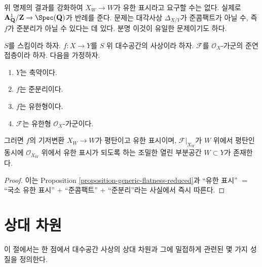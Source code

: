 \noindent
위 명제의 결과를 강화하여 $X_W \to W$가 유한 표시라고 요구할 수는
없다. 실제로
$\mathbf{A}^1_{\mathbf{Q}}/\mathbf{Z} \to \Spec(\mathbf{Q})$가
반례를 준다. 문제는 대각사상 $\Delta_{X/Y}$가 준콤팩트가 아닐 수,
즉 $f$가 준분리가 아닐 수 있다는 데 있다. 분명 이것이 유일한
문제이기도 하다.

\begin{proposition}
\label{proposition-generic-flatness-reduced-quasi-separated}
$S$를 스킴이라 하자.
$f : X \to Y$를 $S$ 위 대수공간의 사상이라 하자.
$\mathcal{F}$를 $\mathcal{O}_X$-가군의 준연접층이라 하자.
다음을 가정하자.
\begin{enumerate}
\item $Y$는 축약이다.
\item $f$는 준분리이다.
\item $f$는 유한형이다.
\item $\mathcal{F}$는 유한형 $\mathcal{O}_X$-가군이다.
\end{enumerate}
그러면 $f$의 기저변환 $X_W \to W$가 평탄이고 유한 표시이며,
$\mathcal{F}|_{X_W}$가 $W$ 위에서 평탄인 동시에
$\mathcal{O}_{X_W}$ 위에서 유한 표시가 되도록 하는 조밀한 열린
부분공간 $W \subset Y$가 존재한다.
\end{proposition}

\begin{proof}
이는 Proposition \ref{proposition-generic-flatness-reduced}과
``유한 표시'' $=$ ``국소 유한 표시'' $+$ ``준콤팩트'' $+$
``준분리''라는 사실에서 즉시 따른다.
\end{proof}















\section{상대 차원}
\label{section-relative-dimension}

\noindent
이 절에서는 한 점에서 대수공간 사상의 상대 차원과 그에 밀접하게
관련된 몇 가지 성질을 정의한다.

